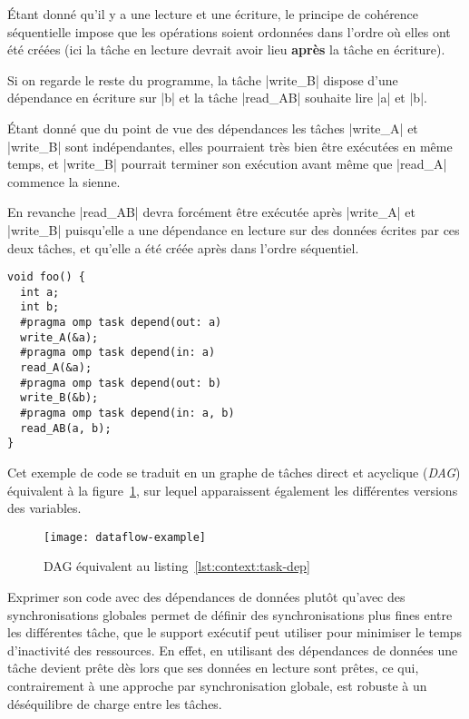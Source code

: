 Étant donné qu'il y a une lecture et une écriture, le principe de cohérence séquentielle impose que les opérations soient ordonnées dans l'ordre où elles ont été créées (ici la tâche en lecture devrait avoir lieu \textbf{après} la tâche en écriture).

Si on regarde le reste du programme, la tâche |write_B| dispose d'une dépendance en écriture sur |b| et la tâche |read_AB| souhaite lire |a| et |b|.

Étant donné que du point de vue des dépendances les tâches |write_A| et |write_B| sont indépendantes, elles pourraient très bien être exécutées en même temps, et |write_B| pourrait terminer son exécution avant même que |read_A| commence la sienne.

En revanche |read_AB| devra forcément être exécutée après |write_A| et |write_B| puisqu'elle a une dépendance en lecture sur des données écrites par ces deux tâches, et qu'elle a été créée après dans l'ordre séquentiel.


\begin{lstlisting}[caption=Synchronisation via des dépendances (OpenMP),label=lst:context:task-dep]
void foo() {
  int a;
  int b;
  #pragma omp task depend(out: a)
  write_A(&a);
  #pragma omp task depend(in: a)
  read_A(&a);
  #pragma omp task depend(out: b)
  write_B(&b);
  #pragma omp task depend(in: a, b)
  read_AB(a, b);
}
\end{lstlisting}

Cet exemple de code se traduit en un graphe de tâches direct et acyclique (\emph{DAG}) équivalent à la figure~\ref{fig:context:dag-dataflow}, sur lequel apparaissent également les différentes versions des variables.

\begin{figure}[ht]
  \centering
  \texttt{[image: dataflow-example]}
  \caption{DAG équivalent au listing~\ref{lst:context:task-dep}}\label{fig:context:dag-dataflow}
\end{figure}

Exprimer son code avec des dépendances de données plutôt qu'avec des synchronisations globales permet de définir des synchronisations plus fines entre les différentes tâche, que le support exécutif peut utiliser pour minimiser le temps d'inactivité des ressources.
En effet, en utilisant des dépendances de données une tâche devient prête dès lors que ses données en lecture sont prêtes, ce qui, contrairement à une approche par synchronisation globale, est robuste à un déséquilibre de charge entre les tâches.


